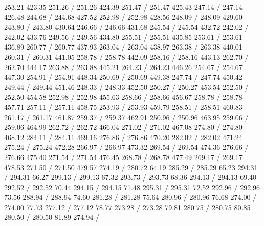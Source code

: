 { 253.21 423.35 251.26 /
 251.26 424.39 251.47 /
 251.47 425.43 247.14 /
 247.14 426.48 244.68 /
 244.68 427.52 252.98 /
 252.98 428.56 248.09 /
 248.09 429.60 243.80 /
 243.80 430.64 246.66 /
 246.66 431.68 245.54 /
 245.54 432.72 242.02 /
 242.02 433.76 249.56 /
 249.56 434.80 255.51 /
 255.51 435.85 253.61 /
 253.61 436.89 260.77 /
 260.77 437.93 263.04 /
 263.04 438.97 263.38 /
 263.38 440.01 260.31 /
 260.31 441.05 258.78 /
 258.78 442.09 258.16 /
 258.16 443.13 262.70 /
 262.70 444.17 263.88 /
 263.88 445.21 264.23 /
 264.23 446.26 254.67 /
 254.67 447.30 254.91 /
 254.91 448.34 250.69 /
 250.69 449.38 247.74 /
 247.74 450.42 249.44 /
 249.44 451.46 248.33 /
 248.33 452.50 250.27 /
 250.27 453.54 252.50 /
 252.50 454.58 252.98 /
 252.98 455.63 258.66 /
 258.66 456.67 258.78 /
 258.78 457.71 257.11 /
 257.11 458.75 253.93 /
 253.93 459.79 258.51 /
 258.51 460.83 261.17 /
 261.17 461.87 259.37 /
 259.37 462.91 250.96 /
 250.96 463.95 259.06 /
 259.06 464.99 262.72 /
 262.72 466.04 271.02 /
 271.02 467.08 274.80 /
 274.80 468.12 284.11 /
 284.11 469.16 276.86 /
 276.86 470.20 282.02 /
 282.02 471.24 275.24 /
 275.24 472.28 266.97 /
 266.97 473.32 269.54 /
 269.54 474.36 276.66 /
 276.66 475.40 271.54 /
 271.54 476.45 268.78 /
 268.78 477.49 269.17 /
 269.17 478.53 271.50 /
 271.50 479.57 274.19 /
\setsolid
{} 280.72 64.19 285.29 /
 285.29 65.23 294.31 /
 294.31 66.27 299.13 /
 299.13 67.32 293.73 /
 293.73 68.36 294.13 /
 294.13 69.40 292.52 /
 292.52 70.44 294.15 /
 294.15 71.48 295.31 /
 295.31 72.52 292.96 /
 292.96 73.56 288.94 /
 288.94 74.60 281.28 /
 281.28 75.64 280.96 /
 280.96 76.68 274.00 /
 274.00 77.73 277.12 /
 277.12 78.77 273.28 /
 273.28 79.81 280.75 /
 280.75 80.85 280.50 /
 280.50 81.89 274.94 /
}
